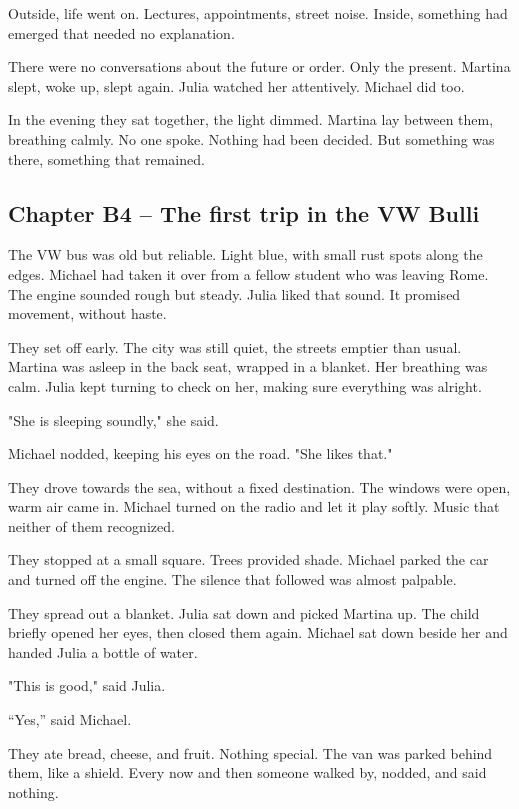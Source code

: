 \documentclass[
]{article}
\begin{document}
Outside, life went on. Lectures, appointments, street noise. Inside, something had emerged that needed no explanation.

There were no conversations about the future or order. Only the present. Martina slept, woke up, slept again. Julia watched her attentively. Michael did too.

In the evening they sat together, the light dimmed. Martina lay between them, breathing calmly. No one spoke. Nothing had been decided. But something was there, something that remained.

\subsection{Chapter B4 -- The first trip in the VW Bulli}\label{chapter-b4-the-first-trip-in-the-vw-bulli}

The VW bus was old but reliable. Light blue, with small rust spots along the edges. Michael had taken it over from a fellow student who was leaving Rome. The engine sounded rough but steady. Julia liked that sound. It promised movement, without haste.

They set off early. The city was still quiet, the streets emptier than usual. Martina was asleep in the back seat, wrapped in a blanket. Her breathing was calm. Julia kept turning to check on her, making sure everything was alright.

"She is sleeping soundly," she said.

Michael nodded, keeping his eyes on the road. "She likes that."

They drove towards the sea, without a fixed destination. The windows were open, warm air came in. Michael turned on the radio and let it play softly. Music that neither of them recognized.

They stopped at a small square. Trees provided shade. Michael parked the car and turned off the engine. The silence that followed was almost palpable.

They spread out a blanket. Julia sat down and picked Martina up. The child briefly opened her eyes, then closed them again. Michael sat down beside her and handed Julia a bottle of water.

"This is good," said Julia.

``Yes,'' said Michael.

They ate bread, cheese, and fruit. Nothing special. The van was parked behind them, like a shield. Every now and then someone walked by, nodded, and said nothing.
\end{document}

